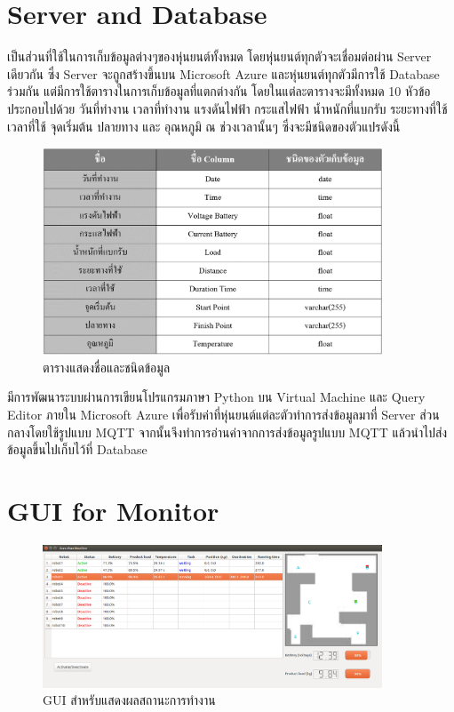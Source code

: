 \documentclass{classes/fiboreport}
\begin{document}
\section{Server and Database}
เป็นส่วนที่ใช้ในการเก็บข้อมูลต่างๆของหุ่นยนต์ทั้งหมด โดยหุ่นยนต์ทุกตัวจะเชื่อมต่อผ่าน Server เดียวกัน
ซึ่ง Server จะถูกสร้างขึ้นบน Microsoft Azure และหุ่นยนต์ทุกตัวมีการใช้ Database ร่วมกัน
แต่มีการใช้ตารางในการเก็บข้อมูลที่แตกต่างกัน โดยในแต่ละตารางจะมีทั้งหมด 10 หัวข้อ
ประกอบไปด้วย วันที่ทำงาน เวลาที่ทำงาน แรงดันไฟฟ้า กระแสไฟฟ้า น้ำหนักที่แบกรับ
ระยะทางที่ใช้ เวลาที่ใช้ จุดเริ่มต้น ปลายทาง และ อุณหภูมิ ณ ช่วงเวลานั้นๆ ซึ่งจะมีชนิดของตัวแปรดังนี้
\begin{figure}[!ht]
	\centering
	\includegraphics[width=0.9\textwidth]{images/datatype_database.png}
	\caption{ตารางแสดงชื่อและชนิดข้อมูล}
	\label{fig:datatype_database}
\end{figure}


มีการพัฒนาระบบผ่านการเขียนโปรแกรมภาษา Python บน Virtual Machine และ Query Editor
ภายใน Microsoft Azure เพื่อรับค่าที่หุ่นยนต์แต่ละตัวทำการส่งข้อมูลมาที่ Server ส่วนกลางโดยใช้รูปแบบ
MQTT จากนั้นจึงทำการอ่านค่าจากการส่งข้อมูลรูปแบบ MQTT แล้วนำไปส่งข้อมูลขึ้นไปเก็บไว้ที่ Database

\clearpage
\section{GUI for Monitor}
\begin{figure}[!ht]
	\centering
	\includegraphics[width=0.9\textwidth]{images/gui_for_monitor.png}
	\caption{GUI สำหรับแสดงผลสถานะการทำงาน}
	\label{fig:gui_for_monitor}
\end{figure}
\end{document}

